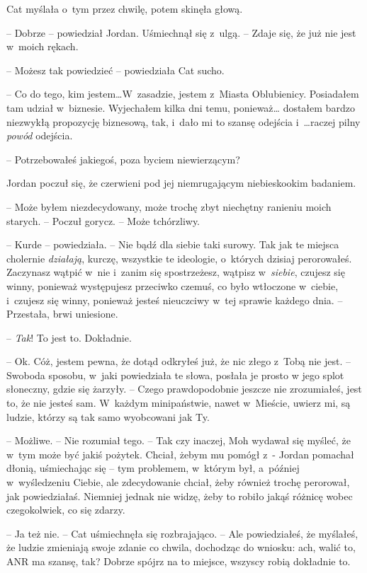 \documentclass[oneside,polish,11pt,sfheadings]{mwbk}
\begin{document}
Cat myślała o~tym przez chwilę, potem skinęła głową.

-- Dobrze -- powiedział Jordan. Uśmiechnął się z~ulgą. -- Zdaje się, że już
nie jest w~moich rękach.

-- Możesz tak powiedzieć -- powiedziała Cat sucho.

-- Co do tego, kim jestem\ldots W~zasadzie, jestem z~Miasta Oblubienicy.
Posiadałem tam udział w~biznesie. Wyjechałem kilka dni temu, ponieważ\ldots
dostałem bardzo niezwykłą propozycję biznesową, tak, i~dało mi to szansę
odejścia i~\ldots raczej pilny \emph{powód} odejścia.

-- Potrzebowałeś jakiegoś, poza byciem niewierzącym?

Jordan poczuł się, że czerwieni pod jej niemrugającym niebieskookim
badaniem. 

-- Może byłem niezdecydowany, może trochę zbyt niechętny
ranieniu moich starych. -- Poczuł gorycz. -- Może tchórzliwy.

-- Kurde -- powiedziała. -- Nie bądź dla siebie taki surowy. Tak jak te
miejsca cholernie \emph{działają}, kurczę, wszystkie te ideologie, o~których dzisiaj perorowałeś. Zaczynasz wątpić w~nie i~zanim się
spostrzeżesz, wątpisz w~\emph{siebie}, czujesz się winny, ponieważ
występujesz przeciwko czemuś, co było wtłoczone w~ciebie, i~czujesz się
winny, ponieważ jesteś nieuczciwy w~tej sprawie każdego dnia. -- Przestała, brwi uniesione.

-- \emph{Tak}! To jest to. Dokładnie.

-- Ok. Cóż, jestem pewna, że dotąd odkryłeś już, że nic złego z~Tobą nie
jest. -- Swoboda sposobu, w~jaki powiedziała te słowa, posłała je prosto
w jego splot słoneczny, gdzie się żarzyły. -- Czego prawdopodobnie
jeszcze nie zrozumiałeś, jest to, że nie jesteś sam. W~każdym
minipaństwie, nawet w~Mieście, uwierz mi, są ludzie, którzy są tak samo
wyobcowani jak Ty.

-- Możliwe. -- Nie rozumiał tego. -- Tak czy inaczej, Moh wydawał się
myśleć, że w~tym może być jakiś pożytek. Chciał, żebym mu pomógł z~-
Jordan pomachał dłonią, uśmiechając się -- tym problemem, w~którym był, a~później w~wyśledzeniu Ciebie, ale zdecydowanie chciał, żeby również
trochę perorował, jak powiedziałaś. Niemniej jednak nie widzę, żeby to
robiło jakąś różnicę wobec czegokolwiek, co się zdarzy.

-- Ja też nie. -- Cat uśmiechnęła się rozbrajająco. -- Ale powiedziałeś, że
myślałeś, że ludzie zmieniają swoje zdanie co chwila, dochodząc do
wniosku: ach, walić to, ANR ma szansę, tak? Dobrze spójrz na to miejsce,
wszyscy robią dokładnie to.
\end{document}
